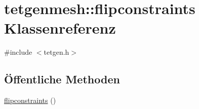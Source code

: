 \hypertarget{classtetgenmesh_1_1flipconstraints}{\section{tetgenmesh\-:\-:flipconstraints Klassenreferenz}
\label{classtetgenmesh_1_1flipconstraints}
}


{\ttfamily \#include $<$tetgen.\-h$>$}

\subsection*{Öffentliche Methoden}
\begin{DoxyCompactItemize}
\item 
\hyperlink{classtetgenmesh_1_1flipconstraints_a4bd90cc95400ddb895ad45d7e5b72f4e}{flipconstraints} ()
\end{DoxyCompactItemize}
